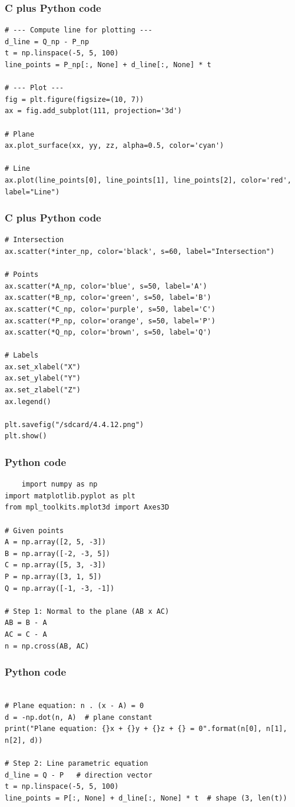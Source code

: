 \documentclass{beamer}
\begin{document}
\begin{frame}[fragile]
    \frametitle{C plus Python code}
    \begin{lstlisting}
# --- Compute line for plotting ---
d_line = Q_np - P_np
t = np.linspace(-5, 5, 100)
line_points = P_np[:, None] + d_line[:, None] * t

# --- Plot ---
fig = plt.figure(figsize=(10, 7))
ax = fig.add_subplot(111, projection='3d')

# Plane
ax.plot_surface(xx, yy, zz, alpha=0.5, color='cyan')

# Line
ax.plot(line_points[0], line_points[1], line_points[2], color='red', label="Line")
\end{lstlisting}
 
\end{frame}
\begin{frame}[fragile]
    \frametitle{C plus Python code}
    \begin{lstlisting}
# Intersection
ax.scatter(*inter_np, color='black', s=60, label="Intersection")

# Points
ax.scatter(*A_np, color='blue', s=50, label='A')
ax.scatter(*B_np, color='green', s=50, label='B')
ax.scatter(*C_np, color='purple', s=50, label='C')
ax.scatter(*P_np, color='orange', s=50, label='P')
ax.scatter(*Q_np, color='brown', s=50, label='Q')

# Labels
ax.set_xlabel("X")
ax.set_ylabel("Y")
ax.set_zlabel("Z")
ax.legend()

plt.savefig("/sdcard/4.4.12.png")
plt.show()
\end{lstlisting}
 
\end{frame}
\begin{frame}[fragile]
    \frametitle{Python code}
    \begin{lstlisting}
    import numpy as np
import matplotlib.pyplot as plt
from mpl_toolkits.mplot3d import Axes3D

# Given points
A = np.array([2, 5, -3])
B = np.array([-2, -3, 5])
C = np.array([5, 3, -3])
P = np.array([3, 1, 5])
Q = np.array([-1, -3, -1])

# Step 1: Normal to the plane (AB x AC)
AB = B - A
AC = C - A
n = np.cross(AB, AC)
\end{lstlisting}
 
\end{frame}
\begin{frame}[fragile]
    \frametitle{Python code}
    \begin{lstlisting}

# Plane equation: n . (x - A) = 0
d = -np.dot(n, A)  # plane constant
print("Plane equation: {}x + {}y + {}z + {} = 0".format(n[0], n[1], n[2], d))

# Step 2: Line parametric equation
d_line = Q - P   # direction vector
t = np.linspace(-5, 5, 100)
line_points = P[:, None] + d_line[:, None] * t  # shape (3, len(t))
\end{lstlisting}
 
\end{frame}
\end{document}
